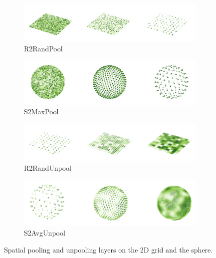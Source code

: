 \documentclass{article}
\begin{document}
\begin{figure}[h!]
    \centering
    \begin{subfigure}[b]{0.48\textwidth}
        \centering
        \includegraphics[width=\textwidth]{Images/r2_pooling.png}
        \caption{R2RandPool}
    \end{subfigure}
    \hfill
    \begin{subfigure}[b]{0.48\textwidth}
        \centering
        \includegraphics[width=\textwidth]{Images/s2_pooling.png}
        \caption{S2MaxPool}
    \end{subfigure}
    \hfill
    \begin{subfigure}[b]{0.48\textwidth}
        \centering
        \includegraphics[width=\textwidth]{Images/r2_unpooling.png}
        \caption{R2RandUnpool}
    \end{subfigure}
    \hfill
    \begin{subfigure}[b]{0.48\textwidth}
        \centering
        \includegraphics[width=\textwidth]{Images/s2_unpooling.png}
        \caption{S2AvgUnpool}
    \end{subfigure}
    \caption{Spatial pooling and unpooling layers on the 2D grid and the sphere.}
    \label{fig:pooling}
\end{figure}
\end{document}
